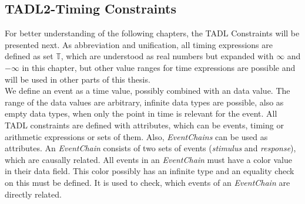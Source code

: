 \subsection{TADL2-Timing Constraints}
	\label{tadl2Constraints}
	For better understanding of the following chapters, the TADL Constraints will be presented next. As abbreviation and unification, all timing expressions are defined as set $\mathbb{T}$, which are understood as real numbers but expanded with $\infty$ and $-\infty$ in this chapter, but other value ranges for time expressions are possible and will be used in other parts of this thesis.\\
	We define an event as a time value, possibly combined with an data value. The range of the data values are arbitrary, infinite data types are possible, also as empty data types, when only the point in time is relevant for the event. All TADL constraints are defined with attributes, which can be events, timing or arithmetic expressions or sets of them. Also, \emph{EventChains} can be used as attributes. An \emph{EventChain} consists of two sets of events (\emph{stimulus} and \emph{response}),  which are causally related. All events in an \emph{EventChain} must have a color value in their data field. This color possibly has an infinite type and an equality check on this must be defined. It is used to check, which events of an \emph{EventChain} are directly related.
